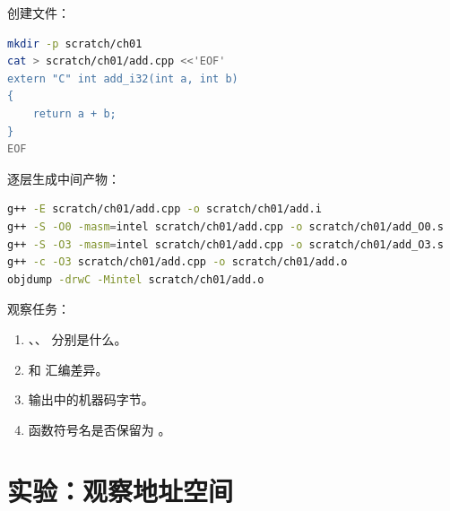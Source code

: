 \begin{labbox}
创建文件：

\begin{lstlisting}[language=bash]
mkdir -p scratch/ch01
cat > scratch/ch01/add.cpp <<'EOF'
extern "C" int add_i32(int a, int b)
{
    return a + b;
}
EOF
\end{lstlisting}

逐层生成中间产物：

\begin{lstlisting}[language=bash]
g++ -E scratch/ch01/add.cpp -o scratch/ch01/add.i
g++ -S -O0 -masm=intel scratch/ch01/add.cpp -o scratch/ch01/add_O0.s
g++ -S -O3 -masm=intel scratch/ch01/add.cpp -o scratch/ch01/add_O3.s
g++ -c -O3 scratch/ch01/add.cpp -o scratch/ch01/add.o
objdump -drwC -Mintel scratch/ch01/add.o
\end{lstlisting}

观察任务：

\begin{enumerate}
  \item {}、、 分别是什么。
  \item {} 和  汇编差异。
  \item {} 输出中的机器码字节。
  \item 函数符号名是否保留为 。
\end{enumerate}
\end{labbox}

\section{实验：观察地址空间}


